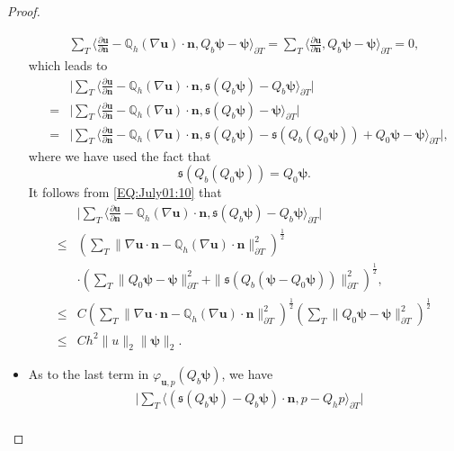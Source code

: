 \documentclass[final,leqno]{siamltex704}
\def\S{{\mathfrak s}}
\begin{document}
\begin{proof}
\begin{itemize}
\begin{eqnarray*}
 \sum_{T}\langle \frac{\partial \bm{u}}{\partial \bm{n}}- \mathbb{Q}_h(\nabla \bm{u})\cdot\bm{n}, Q_b\bm{\psi}-\bm{\psi}\rangle_{\partial T}
=\sum_{T}\langle \frac{\partial \bm{u}}{\partial \bm{n}}, Q_b\bm{\psi}-\bm{\psi}\rangle_{\partial T}
=0,
\end{eqnarray*}
which leads to
\begin{eqnarray*}
&& \bigg|\sum_{T}\langle \frac{\partial \bm{u}}{\partial \bm{n}}- \mathbb{Q}_h(\nabla \bm{u})\cdot\bm{n},\S(Q_b\bm{\psi})-Q_b\bm{\psi}\rangle_{\partial T}\bigg|\\
&=&\bigg|\sum_{T}\langle \frac{\partial \bm{u}}{\partial \bm{n}}- \mathbb{Q}_h(\nabla \bm{u})\cdot\bm{n},\S(Q_b\bm{\psi})-\bm{\psi}\rangle_{\partial T}\bigg| \nonumber\\
&=&\bigg|\sum_{T}\langle \frac{\partial \bm{u}}{\partial \bm{n}}- \mathbb{Q}_h(\nabla \bm{u})\cdot\bm{n},\S(Q_b\bm{\psi})-\S(Q_b(Q_0\bm{\psi})) + Q_0\bm{\psi} - \bm{\psi}\rangle_{\partial T}\bigg|,
\end{eqnarray*}
where we have used the fact that
$$
\S(Q_b(Q_0\bm{\psi})) = Q_0\bm{\psi}.
$$
It follows from \eqref{EQ:July01:10} that
\begin{equation}\label{equ.EL2.2}
\begin{split}
& \bigg|\sum_{T}\langle \frac{\partial \bm{u}}{\partial \bm{n}}- \mathbb{Q}_h(\nabla \bm{u})\cdot\bm{n},\S(Q_b\bm{\psi})-Q_b\bm{\psi}\rangle_{\partial T}\bigg|\\
 \leq & \left( \sum_{T} \|\nabla \bm{u} \cdot \bm{n} - \mathbb{Q}_h(\nabla \bm{u})\cdot\bm{n} \|_{\partial T}^2\right)^{\frac{1}{2}} \\
& \cdot \left( \sum_{T} \| Q_0\bm{\psi} - \bm{\psi}\|_{\partial T}^2 + \|\S(Q_b(\bm{\psi} - Q_0\bm{\psi} ))\|_{\partial T}^2\right)^{\frac{1}{2}}, \\
 \leq & C \left( \sum_{T} \|\nabla \bm{u} \cdot \bm{n} - \mathbb{Q}_h(\nabla \bm{u})\cdot\bm{n} \|_{\partial T}^2\right)^{\frac{1}{2}}
         \left(\sum_{T} \| Q_0\bm{\psi} - \bm{\psi}\|_{\partial T}^2 \right)^{\frac{1}{2}} \\
 \leq & Ch^2\|u\|_2 \|\bm{\psi}\|_2.
 \end{split}
\end{equation}
\item As to the last term in $\varphi_{\bm{u},p}(Q_b \bm{\psi})$, we have
\begin{equation}\label{equ.EL2.3}
\begin{split}
& \bigg|\sum_{T} \langle (\S(Q_b \bm{\psi})-Q_b \bm{\psi})\cdot \bm{n},p - Q_h p\rangle_{\partial T}\bigg| \\

\end{split}
\end{equation}
\end{itemize}
\end{proof}
\end{document}
